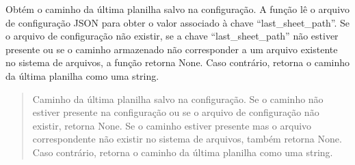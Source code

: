 \documentclass[letterpaper,10pt,english]{sphinxmanual}
\begin{document}
\begin{fulllineitems}
\label{\detokenize{api/config:config.get_last_sheet_path}}
\pysigstartsignatures
\pysiglinewithargsret
{}
{}
{}
\pysigstopsignatures
\sphinxAtStartPar
Obtém o caminho da última planilha salvo na configuração. A função lê o arquivo de configuração JSON para obter o valor associado à chave “last\_sheet\_path”. Se o arquivo de configuração não existir, se a chave “last\_sheet\_path” não estiver presente ou se o caminho armazenado não corresponder a um arquivo existente no sistema de arquivos, a função retorna None. Caso contrário, retorna o caminho da última planilha como uma string.
\begin{quote}\begin{description}
\sphinxAtStartPar
Caminho da última planilha salvo na configuração. Se o caminho não estiver presente na configuração ou se o arquivo de configuração não existir, retorna None. Se o caminho estiver presente mas o arquivo correspondente não existir no sistema de arquivos, também retorna None. Caso contrário, retorna o caminho da última planilha como uma string.

\sphinxAtStartPar
{}

\end{description}\end{quote}

\end{fulllineitems}

\end{document}
